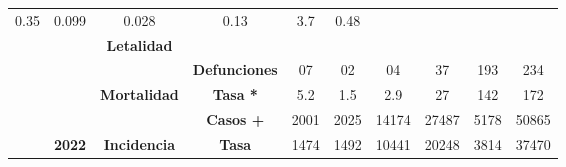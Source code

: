 \begin{tabular}{lccc|cccccc|}
		\multicolumn{1}{c|}{\cellcolor[HTML]{E2EFDA}0.35} &
		\multicolumn{1}{c|}{\cellcolor[HTML]{E2EFDA}0.099} &
		\multicolumn{1}{c|}{\cellcolor[HTML]{E2EFDA}0.028} &
		\multicolumn{1}{c|}{\cellcolor[HTML]{E2EFDA}0.13} &
		\multicolumn{1}{c|}{\cellcolor[HTML]{E2EFDA}3.7} &
		\cellcolor[HTML]{E2EFDA}0.48 \\ \cline{4-10} 
		\multicolumn{1}{l|}{} &
		\multicolumn{1}{c|}{\cellcolor[HTML]{E2EFDA}} &
		\multicolumn{1}{c|}{\multirow{-2}{*}{\cellcolor[HTML]{E2EFDA}\textbf{Letalidad}}} &
		\cellcolor[HTML]{E2EFDA} &
		\multicolumn{1}{c|}{\cellcolor[HTML]{E2EFDA}} &
		\multicolumn{1}{c|}{\cellcolor[HTML]{E2EFDA}} &
		\multicolumn{1}{c|}{\cellcolor[HTML]{E2EFDA}} &
		\multicolumn{1}{c|}{\cellcolor[HTML]{E2EFDA}} &
		\multicolumn{1}{c|}{\cellcolor[HTML]{E2EFDA}} &
		\cellcolor[HTML]{E2EFDA} \\ \cline{3-3}
		\multicolumn{1}{l|}{} &
		\multicolumn{1}{c|}{\cellcolor[HTML]{E2EFDA}} &
		\multicolumn{1}{c|}{\cellcolor[HTML]{E2EFDA}} &
		\multirow{-2}{*}{\cellcolor[HTML]{E2EFDA}\textbf{Defunciones}} &
		\multicolumn{1}{c|}{\multirow{-2}{*}{\cellcolor[HTML]{E2EFDA}07}} &
		\multicolumn{1}{c|}{\multirow{-2}{*}{\cellcolor[HTML]{E2EFDA}02}} &
		\multicolumn{1}{c|}{\multirow{-2}{*}{\cellcolor[HTML]{E2EFDA}04}} &
		\multicolumn{1}{c|}{\multirow{-2}{*}{\cellcolor[HTML]{E2EFDA}37}} &
		\multicolumn{1}{c|}{\multirow{-2}{*}{\cellcolor[HTML]{E2EFDA}193}} &
		\multirow{-2}{*}{\cellcolor[HTML]{E2EFDA}234} \\ \cline{4-10} 
		\multicolumn{1}{l|}{} &
		\multicolumn{1}{c|}{\cellcolor[HTML]{E2EFDA}} &
		\multicolumn{1}{c|}{\multirow{-2}{*}{\cellcolor[HTML]{E2EFDA}\textbf{Mortalidad}}} &
		\cellcolor[HTML]{E2EFDA}\textbf{Tasa *} &
		\multicolumn{1}{c|}{\cellcolor[HTML]{E2EFDA}5.2} &
		\multicolumn{1}{c|}{\cellcolor[HTML]{E2EFDA}1.5} &
		\multicolumn{1}{c|}{\cellcolor[HTML]{E2EFDA}2.9} &
		\multicolumn{1}{c|}{\cellcolor[HTML]{E2EFDA}27} &
		\multicolumn{1}{c|}{\cellcolor[HTML]{E2EFDA}142} &
		\cellcolor[HTML]{E2EFDA}172 \\ \cline{3-10} 
		\multicolumn{1}{l|}{} &
		\multicolumn{1}{c|}{\cellcolor[HTML]{E2EFDA}} &     
		\multicolumn{1}{c|}{\cellcolor[HTML]{E2EFDA}} &
		\cellcolor[HTML]{E2EFDA}\textbf{Casos +} &
		\multicolumn{1}{c|}{\cellcolor[HTML]{E2EFDA}2001} &
		\multicolumn{1}{c|}{\cellcolor[HTML]{E2EFDA}2025} &
		\multicolumn{1}{c|}{\cellcolor[HTML]{E2EFDA}14174} &
		\multicolumn{1}{c|}{\cellcolor[HTML]{E2EFDA}27487} &
		\multicolumn{1}{c|}{\cellcolor[HTML]{E2EFDA}5178} &
		\cellcolor[HTML]{E2EFDA}50865 \\ \cline{4-10} 
		\multicolumn{1}{l|}{} &
		\multicolumn{1}{c|}{\multirow{-6}{*}{\cellcolor[HTML]{E2EFDA}\textbf{2022}}} &
		\multicolumn{1}{c|}{\multirow{-2}{*}{\cellcolor[HTML]{E2EFDA}\textbf{Incidencia}}} &
		\cellcolor[HTML]{E2EFDA}\textbf{Tasa} &
		\multicolumn{1}{c|}{\cellcolor[HTML]{E2EFDA}1474} &
		\multicolumn{1}{c|}{\cellcolor[HTML]{E2EFDA}1492} &
		\multicolumn{1}{c|}{\cellcolor[HTML]{E2EFDA}10441} &
		\multicolumn{1}{c|}{\cellcolor[HTML]{E2EFDA}20248} &
		\multicolumn{1}{c|}{\cellcolor[HTML]{E2EFDA}3814} &
		\cellcolor[HTML]{E2EFDA}37470 \\ \cline{2-10} 
	\end{tabular}